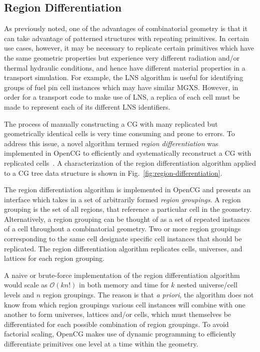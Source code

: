 \subsection{Region Differentiation}
\label{sec:chap4-region-diff}

As previously noted, one of the advantages of combinatorial geometry is that it can take advantage of patterned structures with repeating primitives. In certain use cases, however, it may be necessary to replicate certain primitives which have the same geometric properties but experience very different radiation and/or thermal hydraulic conditions, and hence have different material properties in a transport simulation. For example, the \ac{LNS} algorithm is useful for identifying groups of fuel pin cell instances which may have similar \ac{MGXS}. However, in order for a transport code to make use of \ac{LNS}, a replica of each cell must be made to represent each of its different \ac{LNS} identifiers.


The process of manually constructing a \ac{CG} with many replicated but geometrically identical cells is very time consuming and prone to errors. To address this issue, a novel algorithm termed \textit{region differentiation} was implemented in OpenCG to efficiently and systematically reconstruct a \ac{CG} with replicated cells~\cite{boyd2015opencg}. A characterization of the region differentiation algorithm applied to a \ac{CG} tree data structure is shown in Fig.~\ref{fig:region-differentiation}.

The region differentiation algorithm is implemented in OpenCG and presents an interface which takes in a set of arbitrarily formed \textit{region groupings}. A region grouping is the set of all regions, that reference a particular cell in the geometry. Alternatively, a region grouping can be thought of as a set of repeated instances of a cell throughout a combinatorial geometry. Two or more region groupings corresponding to the same cell designate specific cell instances that should be replicated. The region differentiation algorithm replicates cells, universes, and lattices for each region grouping.

A naive or brute-force implementation of the region differentiation algorithm would scale as $\mathcal{O}(kn!)$ in both memory and time for $k$ nested universe/cell levels and $n$ region groupings. The reason is that \textit{a priori}, the algorithm does not know from which region groupings various cell instances will combine with one another to form universes, lattices and/or cells, which must themselves be differentiated for each possible combination of region groupings. To avoid factorial scaling, OpenCG makes use of dynamic programming to efficiently differentiate primitives one level at a time within the geometry.

